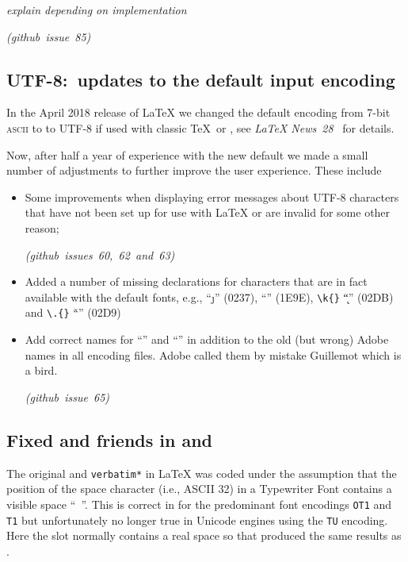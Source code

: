 \documentclass{ltnews}
\providecommand\acro[1]{\textsc{#1}}
\providecommand\XeTeX{\hologo{XeTeX}}
\providecommand\LuaTeX{\hologo{LuaTeX}}
\providecommand\pdfTeX{\hologo{pdfTeX}}
\newcommand\githubissue[2][]{\ifhmode\unskip\fi
     \quad\penalty500\strut\nobreak\hfill
     \mbox{\small\itshape(github issue#1 #2)}\par}
\begin{document}
\emph{explain depending on implementation}
%
\githubissue{85}


\subsection{UTF-8:\ updates to the default input encoding}

In the April 2018 release of \LaTeX{} we changed the default encoding
from 7-bit \acro{ascii} to to UTF-8 if used with classic \TeX\ or
, see \textit{\LaTeX{} News~28}~\cite{ltnews28} for
details.

Now, after half a year of experience with the new default we made a
small number of adjustments to further improve the user experience.
These include
\begin{itemize}
\item
  Some improvements when displaying error messages about UTF-8
  characters that have not been set up for use with \LaTeX{} or are
  invalid for some other reason;
%
\githubissue[s]{60, 62 and 63}
%
\item
  Added a number of missing declarations for characters that are in
  fact available with the default fonts, e.g.,  \enquote{\j}
  (0237),  \enquote{\SS} (1E9E), \verb=\k{}= \enquote{\k{ }}
  (02DB) and \verb=\.{}= \enquote{\.{ }} (02D9)
  \item
    Add correct names for  \enquote{\guillemotleft}
    and  \enquote{\guillemotright} in addition to
    the old (but wrong) Adobe names in all encoding files. Adobe
    called them by mistake Guillemot which is a bird.
%    
  \githubissue{65}
\end{itemize}



\subsection{Fixed  and friends in \XeTeX{} and \LuaTeX{}}


The original  and \texttt{verbatim*} in \LaTeX{} was coded
under the assumption that the position of the space character (i.e.,
ASCII 32) in a Typewriter Font contains a visible space
``\verb*= =''. This is correct in \pdfTeX{} for the predominant
%
font encodings \texttt{OT1} and \texttt{T1} but unfortunately no
longer true in Unicode engines using the \texttt{TU} encoding. Here
the slot normally contains a real space so that  produced
the same results as .
\end{document}
